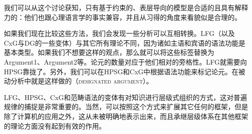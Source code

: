 我们可以从这个讨论获知，只有基于约束的、表层导向的模型是合适的且具有解释力的：他们也跟心理语言学的事实兼容，并且从习得的角度来看貌似是合理的。

如果我们现在比较这些方法，我们会发现一些分析可以互相转换。LFG（以及CxG与DG的一些变体）与其它所有理论不同，因为诸如主语和宾语的语法功能是基本类型。如果我们不想要这样的观点，那么就可以将这些标签替换为Argument1、Argument2等。论元的数量对应于他们相对的旁格性。LFG就需要向HPSG靠拢了。另外，我们可以在HPSG和CxG中根据语法功能来标记论元。在被动分析中就是这样做的（\textsc{designated argument}）。

LFG、HPSG、CxG和范畴语法的变体\citep{MCKRZ89a-u,Briscoe2000a,Villavicencio2002a}有对知识进行层级式组织的方式，这对普遍规律的捕捉是非常重要的。当然，可以按照这个方式来扩展其它任何的框架，但是除了计算机的应用之外，这从未被明确地表示出来，而且承继层级体系在其他框架的理论方面没有起到有效的作用。


